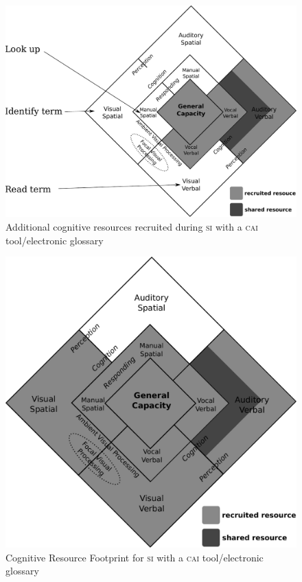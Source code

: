 \documentclass[output=paper]{langsci/langscibook}
\begin{document}
\begin{figure}[p]
        \includegraphics[width=.7\textwidth]{figures/fig2-4.pdf}
\caption{Additional cognitive resources recruited during \textsc{si} with a \textsc{cai} tool/electronic glossary\label{fig:prandi:4}}
\end{figure}

\begin{figure}[p]
	\includegraphics[width=.7\textwidth]{figures/fig2-5.pdf}
\caption{\label{fig:prandi:5}Cognitive Resource Footprint for \textsc{si} with a \textsc{cai} tool/electronic glossary}
\end{figure}
\end{document}
